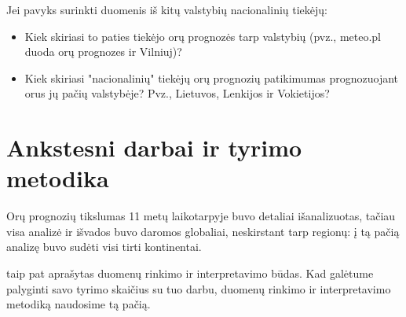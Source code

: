 \documentclass{article}
\begin{document}
Jei pavyks surinkti duomenis iš kitų valstybių nacionalinių tiekėjų:
\begin{itemize}
    \item Kiek skiriasi to paties tiekėjo orų prognozės tarp valstybių (pvz.,
        meteo.pl duoda orų prognozes ir Vilniuj)?
    \item Kiek skiriasi "nacionalinių" tiekėjų orų prognozių patikimumas
        prognozuojant orus jų pačių valstybėje? Pvz., Lietuvos, Lenkijos ir
        Vokietijos?
\end{itemize}

\section{Ankstesni darbai ir tyrimo metodika}

Orų prognozių tikslumas 11 metų laikotarpyje buvo detaliai
išanalizuotas\cite{rose2017analysis}, tačiau visa analizė ir išvados buvo
daromos globaliai, neskirstant tarp regionų: į tą pačią analizę buvo sudėti
visi tirti kontinentai.

\cite{rose2017analysis} taip pat aprašytas duomenų rinkimo ir interpretavimo
būdas. Kad galėtume palyginti savo tyrimo skaičius su tuo darbu, duomenų
rinkimo ir interpretavimo metodiką naudosime tą pačią.

{}

\end{document}
